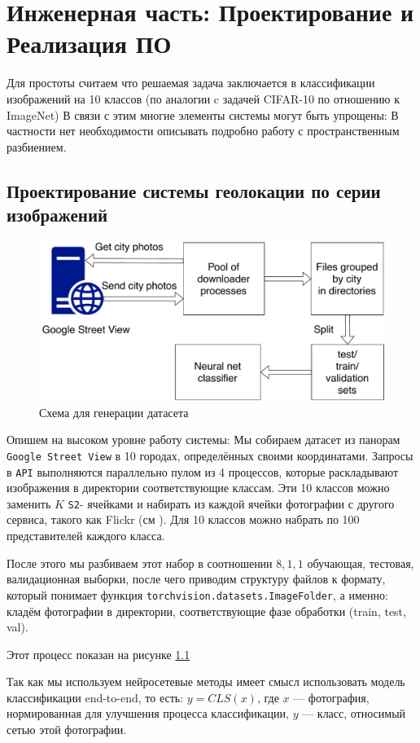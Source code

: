 \chapter{Инженерная часть: Проектирование и Реализация ПО}

Для простоты считаем что решаемая задача заключается в классификации изображений на 10 классов (по аналогии c задачей CIFAR-10 по отношению к ImageNet)
В связи с этим многие элементы системы могут быть упрощены:
В частности нет необходимости описывать подробно работу с пространственным разбиением.
\section{Проектирование системы геолокации по серии изображений}

\begin{figure}[h]
	\centering
	\includegraphics[width=0.7\linewidth]{img/dataset_generation}
	\caption{Схема для генерации датасета}
	\label{fig:datasetgeneration}
\end{figure}

Опишем на высоком уровне работу системы:
Мы собираем датасет из панорам \texttt{Google Street View} в 10 городах, определённых своими координатами. Запросы в \texttt{API} выполняются параллельно пулом из 4 процессов, которые раскладывают изображения в директории соответствующие классам. Эти 10 классов можно заменить $ K $
\texttt{S2}- ячейками и набирать из каждой ячейки фотографии с другого сервиса, такого как Flickr (см \cite{im2gps}). Для 10 классов можно набрать по 100 представителей каждого класса.

После этого мы разбиваем этот набор в соотношении $ 8,1,1 $
обучающая, тестовая, валидационная выборки, после чего приводим структуру файлов к формату, который понимает функция \texttt{torchvision.datasets.ImageFolder}, а именно: кладём фотографии в директории, соответствующие фазе обработки (train, test, val).

Этот процесс показан на рисунке \ref{fig:datasetgeneration}

Так как мы используем нейросетевые методы имеет смысл использовать модель классификации end-to-end, то есть:
$ y = CLS(x) $, где $ x $ --- фотография, нормированная для улучшения процесса классификации, $ y $ --- класс, относимый сетью этой фотографии.

